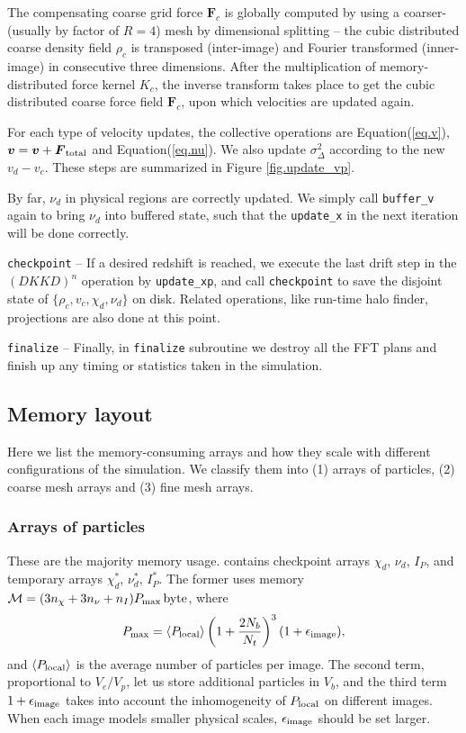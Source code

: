 \documentclass[10pt,twocolumn,preprint]{emulateapj}
\newcommand{\bs}{\boldsymbol}
\begin{document}
The compensating coarse grid force ${\bs F}_c$ is globally computed by using a coarser- (usually by factor of $R=4$) mesh by dimensional splitting -- the cubic distributed coarse density field $\rho_c$ is transposed (inter-image) and Fourier transformed (inner-image) in consecutive three dimensions. After the multiplication of memory-distributed force kernel $K_c$, the inverse transform takes place to get the cubic distributed coarse force field ${\bs F}_c$, upon which velocities are updated again.

For each type of velocity updates, the collective operations are Equation(\ref{eq.v}), ${\bs v}={\bs v}+{\bs F}_{\rm total}$ and Equation(\ref{eq.nu}). We also update $\sigma^2_{\Delta}$ according to the new $v_d-v_c$. These steps are summarized in Figure \ref{fig.update_vp}.  

By far, $\nu_d$ in physical regions are correctly updated. We simply call {\tt buffer\_v} again to bring $\nu_d$ into buffered state, such that the {\tt update\_x} in the next iteration will be done correctly.

{\tt checkpoint} -- 
If a desired redshift is reached, we execute the last drift step in the $(DKKD)^n$ operation by {\tt update\_xp}, and call {\tt checkpoint} to save the disjoint state of $\{\rho_c,v_c,\chi_d,\nu_d\}$ on disk. Related operations, like run-time halo finder, projections are also done at this point.

{\tt finalize} --
Finally, in {\tt finalize} subroutine we destroy all the FFT plans and finish up any timing or statistics taken in the simulation.

\subsection{Memory layout}\label{ss.memory}
Here we list the memory-consuming arrays and how they scale with different configurations of the simulation. We classify them into (1) arrays of particles, (2) coarse mesh arrays and (3) fine mesh arrays.

\subsubsection{Arrays of particles}
These are the majority memory usage. contains checkpoint arrays $\chi_d$, $\nu_d$, $I_P$, and temporary arrays $\chi_d^*$, $\nu_d^*$, $I_P^*$. The former uses memory $\mathcal{M}=(3n_\chi+3n_\nu+n_I)P_{\rm max}\,{\rm byte}$, where
\begin{equation}\label{eq.npmax}
	P_{\rm max}=\left\langle P_{\rm local} \right\rangle \left( 1+\frac{2N_b}{N_t} \right)^3(1+\epsilon_{\rm image}),
\end{equation}
and $\left\langle P_{\rm local} \right\rangle$ is the average number of particles per image. The second term, proportional to $V_e/V_p$,  let us store additional particles in $V_b$, and the third term $1+\epsilon_{\rm image}$ takes into account the inhomogeneity of $P_{\rm local}$ on different images. When each image models smaller physical scales, $\epsilon_{\rm image}$ should be set larger. 
\end{document}
